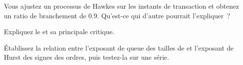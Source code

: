 \begin{interviewq}\label{iq:rs:trade-flow-features:4}
Vous ajustez un processus de Hawkes sur les instants de transaction et obtenez un ratio de branchement de 0.9. Qu'est-ce qui d'autre pourrait l'expliquer~?
\end{interviewq}

\begin{interviewq}\label{iq:rs:trade-flow-features:5}
Expliquez le  et sa principale critique.
\end{interviewq}

\begin{interviewq}\label{iq:rs:trade-flow-features:6}
Établissez la relation entre l'exposant de queue des tailles de  et l'exposant de Hurst des signes des ordres, puis testez-la sur une série.
\end{interviewq}
